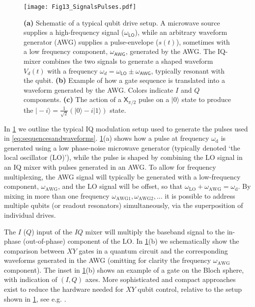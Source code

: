 \documentclass[aip,apr,twocolumn,showpacs,superscriptaddress,groupedaddress,nofootinbib,reprint]{revtex4-1}  %
\newcommand{\X}[1]{\textsf{X}_{#1}}
\begin{document}
\begin{figure}[!t]
\begin{center}
\texttt{[image: Fig13\_SignalsPulses.pdf]}
\caption{\textbf{(a)} Schematic of a typical qubit drive setup. A microwave source supplies a high-frequency signal ($\omega_\textsf{LO}$), while an arbitrary waveform generator (AWG) supplies a pulse-envelope ($s(t)$), sometimes with a low frequency component, $\omega_\textsf{AWG}$, generated by the AWG. The IQ-mixer combines the two signals to generate a shaped waveform $V_d(t)$ with a frequency $\omega_d = \omega_\textsf{LO} \pm \omega_\textsf{AWG}$, typically resonant with the qubit. \textbf{(b)} Example of how a gate sequence is translated into a waveform generated by the AWG. Colors indicate $I$ and $Q$ components. \textbf{(c)} The action of a $\X{\pi/2}$ pulse on a $|0\rangle$ state to produce the $|\!-\!i\rangle = \frac{1}{\sqrt{2}}\left(|0\rangle -i |1\rangle \right)$ state.}
\label{Fig:SignalsPulses}
\end{center}
\end{figure}

In \cref{Fig:SignalsPulses} we outline the typical IQ modulation setup used to generate the pulses used in \cref{eq:sequencesandwaveforms}. \cref{Fig:SignalsPulses}(a) shows how a pulse at frequency $\omega_\text{d}$ is generated using a low phase-noise microwave generator (typically denoted `the local oscillator (LO)'), while the pulse is shaped by combining the LO signal in an IQ mixer with pulses generated in an AWG. To allow for frequency multiplexing, the AWG signal will typically be generated with a low-frequency component, $\omega_\text{AWG}$, and the LO signal will be offset, so that $\omega_\text{LO} + \omega_\text{AWG} = \omega_\text{d}$. By mixing in more than one frequency $\omega_\text{AWG1}, \omega_\text{AWG2}, ...$ it is possible to address multiple qubits (or readout resonators) simultaneously, via the superposition of individual drives.

The $I$ ($Q$) input of the $IQ$ mixer will multiply the baseband signal to the in-phase (out-of-phase) component of the LO. In \cref{Fig:SignalsPulses}(b) we schematically show the comparison between $XY$ gates in a quantum circuit and the corresponding waveforms generated in the AWG (omitting for clarity the frequency $\omega_\text{AWG}$ component). The inset in \cref{Fig:SignalsPulses}(b) shows an example of a gate on the Bloch sphere, with indication of $(I,Q)$ axes. More sophisticated and compact approaches exist to reduce the hardware needed for $XY$ qubit control, relative to the setup shown in \cref{Fig:SignalsPulses}, see e.g. \cite{Vesterinen2014,Asaad2016,Ryan2017}.
\end{document}
